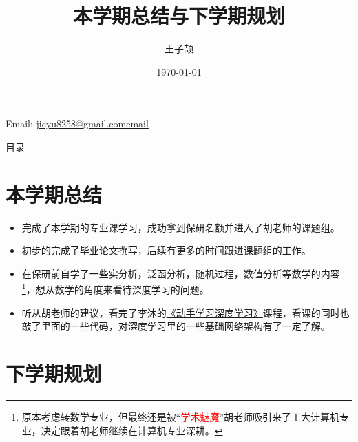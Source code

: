 \documentclass[aspectratio=169]{beamer}
\title{本学期总结与下学期规划}
\author{王子颉}
\institute{School of Computer and Informatics, HFUT}
\date{\today}
\makeatletter
\newcommand{\contactinfo}{
  \begin{center}
    Email: \href{mailto:jieyu8258@gmail.com}{jieyu8258@gmail.comemail}
  \end{center}
}
\makeatother
\begin{document}
\begin{frame}
	\maketitle
	\contactinfo
\end{frame}

\begin{frame}{目录}
	\tableofcontents
\end{frame}

\section{本学期总结}

\begin{frame}
  \begin{itemize}
    \item 完成了本学期的专业课学习，成功拿到保研名额并进入了胡老师的课题组。\pause
    \item 初步的完成了毕业论文撰写，后续有更多的时间跟进课题组的工作。\pause
    \item 在保研前自学了一些实分析，泛函分析，随机过程，数值分析等数学的内容\footnote<3->{原本考虑转数学专业，但最终还是被“\textcolor{red}{学术魅魔}”胡老师吸引来了工大计算机专业，决定跟着胡老师继续在计算机专业深耕。}，想从数学的角度来看待深度学习的问题。\pause
    \item 听从胡老师的建议，看完了李沐的\href{https://space.bilibili.com/1567748478/channel/seriesdetail?sid=358497}{《动手学习深度学习》}课程，看课的同时也敲了里面的一些代码，对深度学习里的一些基础网络架构有了一定了解。
  \end{itemize}
\end{frame}

\section{下学期规划}
\end{document}
